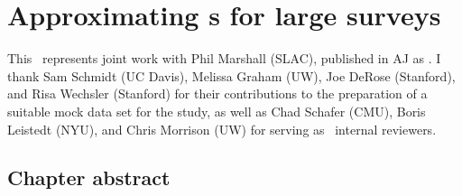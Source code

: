 \renewcommand{\chapid}{qp}

\newcommand{\mgdata}{bright\xspace}
\newcommand{\Mgdata}{Bright\xspace}
\newcommand{\ssdata}{faint\xspace}
\newcommand{\Ssdata}{Faint\xspace}

\newcommand*\patchAmsMathEnvironmentForLineno[1]{%
	\expandafter\let\csname old#1\expandafter\endcsname\csname #1\endcsname
	\expandafter\let\csname oldend#1\expandafter\endcsname\csname end#1\endcsname
	\renewenvironment{#1}%
	{\linenomath\csname old#1\endcsname}%
	{\csname oldend#1\endcsname\endlinenomath}}%
\newcommand*\patchBothAmsMathEnvironmentsForLineno[1]{%
	\patchAmsMathEnvironmentForLineno{#1}%
	\patchAmsMathEnvironmentForLineno{#1*}}%

\chapter{Approximating \pzpdf s for large surveys}

This \paper\ represents joint work with Phil Marshall (SLAC), published in AJ as \citet{malz_approximating_2018}.
I thank Sam Schmidt (UC Davis), Melissa Graham (UW), Joe DeRose (Stanford), and Risa Wechsler (Stanford) for their contributions to the preparation of a suitable mock data set for the study, as well as Chad Schafer (CMU), Boris Leistedt (NYU), and Chris Morrison (UW) for serving as \desc\ internal reviewers.

\section*{Chapter abstract}


